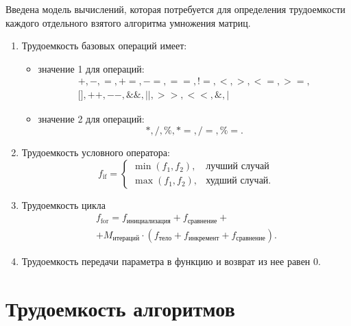 Введена модель вычислений, которая потребуется для определения трудоемкости каждого отдельного взятого алгоритма умножения матриц.
\begin{enumerate}
    \item Трудоемкость базовых операций имеет:
    \begin{itemize}
        \item значение 1 для операций:
        \begin{equation}
            \begin{gathered}
                +, -, =, +=, -=, ==, !=, <, >, <=, >=, \\ 
                \text{[]}, ++, --, \&\&, ||, >>, <<, \&, |
            \end{gathered}
        \end{equation}
        \item значение 2 для операций:
        \begin{equation}
            *, /, \%, *=, /=, \%=.
        \end{equation}
    \end{itemize}
    \item Трудоемкость условного оператора:
    \begin{equation}
        f_{\text{if}} =
        \begin{cases}
            \min({f_1, f_2}), & \text{лучший случай} \\
            \max({f_1, f_2}), & \text{худший случай}.
        \end{cases}
    \end{equation}
    \item Трудоемкость цикла
    \begin{equation}
        \begin{gathered}
            f_{\text{for}} = f_{\text{инициализация}} + f_{\text{сравнение}} + \\
            + M_{\text{итераций}} \cdot (f_{\text{тело}} + f_{\text{инкремент}} + f_{\text{сравнение}}).
        \end{gathered} 
    \end{equation}
    \item Трудоемкость передачи параметра в функцию и возврат из нее равен 0.
\end{enumerate}

\section{Трудоемкость алгоритмов}

